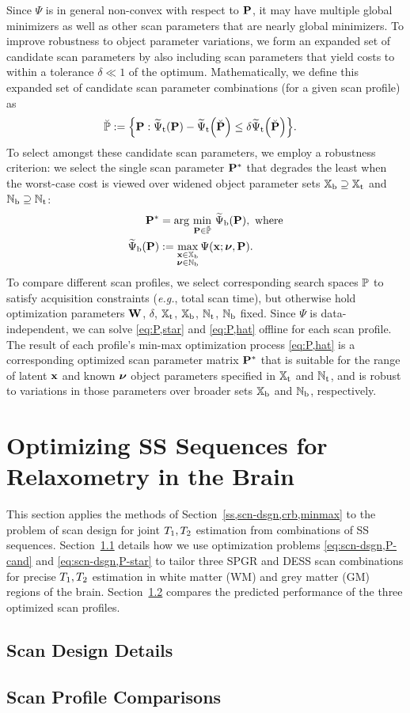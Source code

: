 Since $\Psi$ is in general non-convex 
with respect to $\mathbf{P}$, 
it may have multiple global minimizers 
as well as other scan parameters 
that are nearly global minimizers. 
To improve robustness 
to object parameter variations, 
we form an expanded set of candidate scan parameters 
by also including scan parameters 
that yield costs to within a tolerance $\delta \ll 1$ 
of the optimum. 
Mathematically, 
we define this expanded set 
of candidate scan parameter combinations 
(for a given scan profile) as 
\begin{align}
	\setPc &:= 
		\set{\bmP : \costawt{\bmP} - \costawt{\bmPc} \le \delta \costawt{\bmPc}}.
		\label{eq:scn-dsgn,set}
\end{align}
To select amongst these candidate scan parameters, 
we employ a robustness criterion: 
we select the single scan parameter $\mathbf{P}^*$ 
that degrades the least 
when the worst-case cost is viewed 
over widened object parameter sets 
$\mathbb{X}_\mathrm{b} \supseteq \mathbb{X}_\mathrm{t}$ and $\mathbb{N}_\mathrm{b} \supseteq \mathbb{N}_\mathrm{t}$:
\begin{align}
	\bmPs &= 
		\argmin{\bmP \in \setPc} \costawb{\bmP}, \where
		\label{eq:scn-dsgn,P-star} \\
	\costawb{\bmP} &:=
		\max_{\substack{\bmx \in \setXb \\ \bmnu \in \setNb}}
		\costa{\bmx; \bmnu, \bmP}.
		\label{eq:scn-dsgn,cost-broad}
\end{align}
To compare different scan profiles, 
we select corresponding search spaces $\mathbb{P}$ 
to satisfy acquisition constraints 
(\emph{e.g.}, total scan time), 
but otherwise hold optimization parameters 
$\mathbf{W}$, $\delta$, $\mathbb{X}_\mathrm{t}$, $\mathbb{X}_\mathrm{b}$, $\mathbb{N}_\mathrm{t}$, $\mathbb{N}_\mathrm{b}$ fixed.
Since $\Psi$ is data-independent, 
we can solve \eqref{eq:P,star} and \eqref{eq:P,hat} offline 
for each scan profile. 
The result of each profile's min-max optimization process \eqref{eq:P,hat} 
is a corresponding optimized scan parameter matrix $\mathbf{P}^*$ 
that is suitable for the range 
of latent $\mathbf{x}$ and known $\boldsymbol{\nu}$ object parameters specified 
in $\mathbb{X}_\mathrm{t}$ and $\mathbb{N}_\mathrm{t}$, 
and is robust to variations in those parameters 
over broader sets $\mathbb{X}_\mathrm{b}$ and $\mathbb{N}_\mathrm{b}$, 
respectively.

\section{Optimizing SS Sequences for Relaxometry in the Brain}
\label{s,scn-dsgn,opt}

This section applies the methods 
of Section~\ref{ss,scn-dsgn,crb,minmax} 
to the problem of scan design 
for joint $T_1,T_2$ estimation 
from combinations of SS sequences. 
Section~\ref{ss,scn-dsgn,opt,design} details 
how we use optimization problems
\eqref{eq:scn-dsgn,P-cand} and \eqref{eq:scn-dsgn,P-star} 
to tailor three SPGR and DESS scan combinations
for precise $T_1,T_2$ estimation 
in white matter (WM) and grey matter (GM) regions 
of the brain. 
Section~\ref{ss,scn-dsgn,opt,compare} compares the predicted performance 
of the three optimized scan profiles.

\subsection{Scan Design Details}
\label{ss,scn-dsgn,opt,design}



\subsection{Scan Profile Comparisons}
\label{ss,scn-dsgn,opt,compare}
